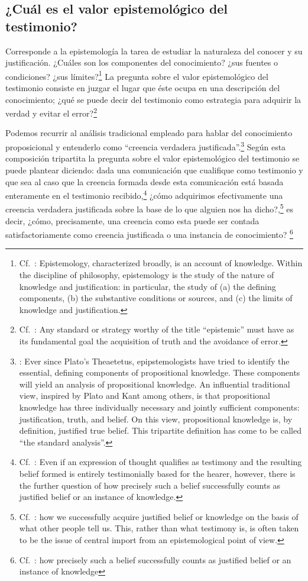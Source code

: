 \subsection{¿Cuál es el valor epistemológico del testimonio?}
Corresponde a la epistemología la tarea de estudiar la naturaleza del conocer y
su justificación. ¿Cuáles son los componentes del conocimiento? ¿sus fuentes o
condiciones? ¿sus límites?\footnote{Cf.~\cite[3]{moser2002ep}: Epistemology,
  characterized broadly, is an account of knowledge. Within the discipline of
  philosophy, epistemology is the study of the nature of knowledge and
  justification: in particular, the study of (a) the defining components, (b)
  the substantive conditions or sources, and (c) the limits of knowledge and
  justification.} La pregunta sobre el valor epistemológico del testimonio
consiste en juzgar el lugar que éste ocupa en una descripción del conocimiento;
¿qué se puede decir del testimonio como estrategia para adquirir la verdad y
evitar el error?\footnote{Cf.~\cite[14]{moser2002ep}: Any standard or strategy
  worthy of the title ``epistemic'' must have as its fundamental goal the
  acquisition of truth and the avoidance of error.}

Podemos recurrir al análisis tradicional empleado para hablar del conocimiento
proposicional y entenderlo como \enquote{creencia verdadera
  justificada}.\footnote{\cite[4]{moser2002ep}: Ever since Plato's Theaetetus,
  epipstemologists have tried to identify the essential, defining components of
  propositional knowledge. These components will yield an analysis of
  propositional knowledge. An influential traditional view, inspired by Plato
  and Kant among others, is that propositional knowledge has three individually
  necessary and jointly sufficient components: justification, truth, and belief.
  On this view, propositional knowledge is, by definition, justified true
  belief. This tripartite definition has come to be called ``the standard
  analysis''.} Según esta composición tripartita la pregunta sobre el valor
epistemológico del testimonio se puede plantear diciendo: dada una comunicación
que cualifique como testimonio y que sea al caso que la creencia formada desde
esta comunicación está basada enteramente en el testimonio
recibido,\footnote{Cf.~\cite[4]{lackeysosa2006eptest}: Even if an expression of
  thought qualifies as testimony and the resulting belief formed is entirely
  testimonially based for the hearer, however, there is the further question of
  how precisely such a belief successfully counts as justified belief or an
  instance of knowledge.} ¿cómo adquirimos efectivamente una creencia verdadera
justificada sobre la base de lo que alguien nos ha
dicho?,\footnote{Cf.~\cite[2]{lackeysosa2006eptest}: how we successfully acquire
  justified belief or knowledge on the basis of what other people tell us. This,
  rather than what testimony is, is often taken to be the issue of central
  import from an epistemological point of view.} es decir, ¿cómo, precisamente,
una creencia como esta puede ser contada satisfactoriamente como creencia
justificada o una instancia de conocimiento?
\footnote{Cf.~\cite[4]{lackeysosa2006eptest}: how precisely such a belief
  successfully counts as justified belief or an instance of knowledge}

